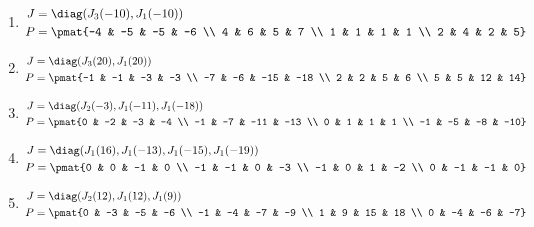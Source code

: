\begin{enumerate}
\item

\begin{align*}
J &= \diag(J_{3}(-10), J_{1}(-10))\\
P &= \pmat{-4 & -5 & -5 & -6 \\ 4 & 6 & 5 & 7 \\ 1 & 1 & 1 & 1 \\ 2 & 4 & 2 & 5}
\end{align*}

\item

\begin{align*}
J &= \diag(J_{3}(20), J_{1}(20))\\
P &= \pmat{-1 & -1 & -3 & -3 \\ -7 & -6 & -15 & -18 \\ 2 & 2 & 5 & 6 \\ 5 & 5 & 12 & 14}
\end{align*}

\item

\begin{align*}
J &= \diag(J_{2}(-3), J_{1}(-11), J_{1}(-18))\\
P &= \pmat{0 & -2 & -3 & -4 \\ -1 & -7 & -11 & -13 \\ 0 & 1 & 1 & 1 \\ -1 & -5 & -8 & -10}
\end{align*}

\item

\begin{align*}
J &= \diag(J_{1}(16), J_{1}(-13), J_{1}(-15), J_{1}(-19))\\
P &= \pmat{0 & 0 & -1 & 0 \\ -1 & -1 & 0 & -3 \\ -1 & 0 & 1 & -2 \\ 0 & -1 & -1 & 0}
\end{align*}

\item

\begin{align*}
J &= \diag(J_{2}(12), J_{1}(12), J_{1}(9))\\
P &= \pmat{0 & -3 & -5 & -6 \\ -1 & -4 & -7 & -9 \\ 1 & 9 & 15 & 18 \\ 0 & -4 & -6 & -7}
\end{align*}


\end{enumerate}

